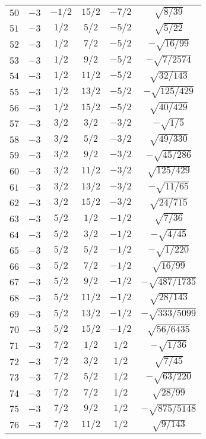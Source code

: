 \begin{table}
\begin{center}
\begin{tabular}{|c|c|c|c|c|c|}
$50$ & $-3$ & $-1/2$ & $15/2$ & $-7/2$ & $\sqrt{8/39}$ \\ 
$51$ & $-3$ & $1/2$ & $5/2$ & $-5/2$ & $\sqrt{5/22}$ \\ 
$52$ & $-3$ & $1/2$ & $7/2$ & $-5/2$ & $-\sqrt{16/99}$ \\ 
$53$ & $-3$ & $1/2$ & $9/2$ & $-5/2$ & $-\sqrt{7/2574}$ \\ 
$54$ & $-3$ & $1/2$ & $11/2$ & $-5/2$ & $\sqrt{32/143}$ \\ 
$55$ & $-3$ & $1/2$ & $13/2$ & $-5/2$ & $-\sqrt{125/429}$ \\ 
$56$ & $-3$ & $1/2$ & $15/2$ & $-5/2$ & $\sqrt{40/429}$ \\ 
$57$ & $-3$ & $3/2$ & $3/2$ & $-3/2$ & $-\sqrt{1/5}$ \\ 
$58$ & $-3$ & $3/2$ & $5/2$ & $-3/2$ & $\sqrt{49/330}$ \\ 
$59$ & $-3$ & $3/2$ & $9/2$ & $-3/2$ & $-\sqrt{45/286}$ \\ 
$60$ & $-3$ & $3/2$ & $11/2$ & $-3/2$ & $\sqrt{125/429}$ \\ 
$61$ & $-3$ & $3/2$ & $13/2$ & $-3/2$ & $-\sqrt{11/65}$ \\ 
$62$ & $-3$ & $3/2$ & $15/2$ & $-3/2$ & $\sqrt{24/715}$ \\ 
$63$ & $-3$ & $5/2$ & $1/2$ & $-1/2$ & $\sqrt{7/36}$ \\ 
$64$ & $-3$ & $5/2$ & $3/2$ & $-1/2$ & $-\sqrt{4/45}$ \\ 
$65$ & $-3$ & $5/2$ & $5/2$ & $-1/2$ & $-\sqrt{1/220}$ \\ 
$66$ & $-3$ & $5/2$ & $7/2$ & $-1/2$ & $\sqrt{16/99}$ \\ 
$67$ & $-3$ & $5/2$ & $9/2$ & $-1/2$ & $-\sqrt{487/1735}$ \\ 
$68$ & $-3$ & $5/2$ & $11/2$ & $-1/2$ & $\sqrt{28/143}$ \\ 
$69$ & $-3$ & $5/2$ & $13/2$ & $-1/2$ & $-\sqrt{333/5099}$ \\ 
$70$ & $-3$ & $5/2$ & $15/2$ & $-1/2$ & $\sqrt{56/6435}$ \\ 
$71$ & $-3$ & $7/2$ & $1/2$ & $1/2$ & $-\sqrt{1/36}$ \\ 
$72$ & $-3$ & $7/2$ & $3/2$ & $1/2$ & $\sqrt{7/45}$ \\ 
$73$ & $-3$ & $7/2$ & $5/2$ & $1/2$ & $-\sqrt{63/220}$ \\ 
$74$ & $-3$ & $7/2$ & $7/2$ & $1/2$ & $\sqrt{28/99}$ \\ 
$75$ & $-3$ & $7/2$ & $9/2$ & $1/2$ & $-\sqrt{875/5148}$ \\ 
$76$ & $-3$ & $7/2$ & $11/2$ & $1/2$ & $\sqrt{9/143}$ \\ 

\end{tabular}
\end{center}
\end{table}
